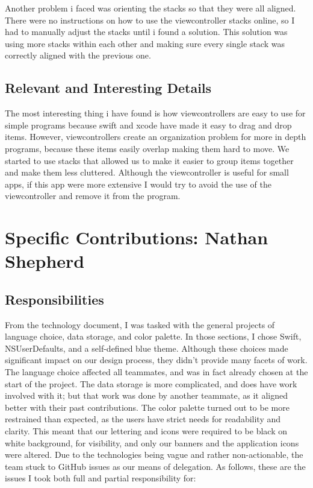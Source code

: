 \documentclass[onecolumn, draftclsnofoot,10pt, compsoc]{IEEEtran}
\begin{document}
    Another problem i faced was orienting the stacks so that they were all aligned.
    There were no instructions on how to use the viewcontroller stacks online, so I had to manually adjust the stacks until i found a solution.
    This solution was using more stacks within each other and making sure every single stack was correctly aligned with the previous one.

\subsection{Relevant and Interesting Details}
      The most interesting thing i have found is how viewcontrollers are easy to use for simple programs because swift and xcode have made it easy to drag and drop items. 
      However, viewcontrollers create an organization problem for more in depth programs, because these items easily overlap making them hard to move.  
      We started to use stacks that allowed us to make it easier to group items together and make them less cluttered. 
      Although the viewcontroller is useful for small apps, if this app were more extensive I would try to avoid the use of the viewcontroller and remove it from the program. 
\section{Specific Contributions: Nathan Shepherd}

\subsection{Responsibilities}

From the technology document, I was tasked with the general projects of language choice, data storage, and color palette.
In those sections, I chose Swift, NSUserDefaults, and a self-defined blue theme.
Although these choices made significant impact on our design process, they didn't provide many facets of work.
The language choice affected all teammates, and was in fact already chosen at the start of the project.
The data storage is more complicated, and does have work involved with it; but that work was done by another teammate, as it aligned better with their past contributions.
The color palette turned out to be more restrained than expected, as the users have strict needs for readability and clarity.
This meant that our lettering and icons were required to be black on white background, for visibility, and only our banners and the application icons were altered.
Due to the technologies being vague and rather non-actionable, the team stuck to GitHub issues as our means of delegation.
As follows, these are the issues I took both full and partial responsibility for:
\end{document}
